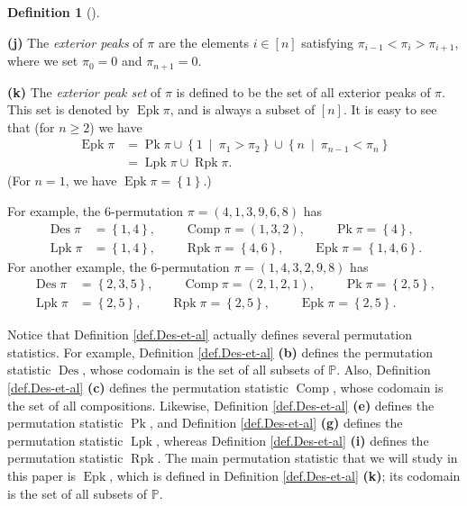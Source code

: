 \documentclass[numbers=enddot,12pt,final,onecolumn,notitlepage]{scrartcl}%
\theoremstyle{definition}
\newtheorem{defi}[theo]{Definition}
\newenvironment{definition}[1][]
{\begin{defi}[#1]\begin{leftbar}}
{\end{leftbar}\end{defi}}
\begin{document}
\begin{definition}
\textbf{(j)} The \textit{exterior peaks} of $\pi$ are the elements
$i\in\left[  n\right]  $ satisfying $\pi_{i-1}<\pi_{i}>\pi_{i+1}$, where we
set $\pi_{0}=0$ and $\pi_{n+1}=0$.

\textbf{(k)} The \textit{exterior peak set} of $\pi$ is defined to be the set
of all exterior peaks of $\pi$. This set is denoted by $\operatorname*{Epk}%
\pi$, and is always a subset of $\left[  n\right]  $. It is easy to see that
(for $n\geq2$) we have%
\begin{align*}
\operatorname*{Epk}\pi &  =\operatorname*{Pk}\pi\cup\left\{  1\ \mid\ \pi
_{1}>\pi_{2}\right\}  \cup\left\{  n\ \mid\ \pi_{n-1}<\pi_{n}\right\} \\
&  =\operatorname*{Lpk}\pi\cup\operatorname*{Rpk}\pi.
\end{align*}
(For $n=1$, we have $\operatorname*{Epk}\pi=\left\{  1\right\}  $.)
\end{definition}

For example, the $6$-permutation $\pi=\left(  4,1,3,9,6,8\right)  $ has%
\begin{align*}
\operatorname*{Des}\pi &  =\left\{  1,4\right\}
,\ \ \ \ \ \ \ \ \ \ \operatorname*{Comp}\pi=\left(  1,3,2\right)
,\ \ \ \ \ \ \ \ \ \ \operatorname*{Pk}\pi=\left\{  4\right\}  ,\\
\operatorname*{Lpk}\pi &  =\left\{  1,4\right\}
,\ \ \ \ \ \ \ \ \ \ \operatorname*{Rpk}\pi=\left\{  4,6\right\}
,\ \ \ \ \ \ \ \ \ \ \operatorname*{Epk}\pi=\left\{  1,4,6\right\}  .
\end{align*}
For another example, the $6$-permutation $\pi=\left(  1,4,3,2,9,8\right)  $
has%
\begin{align*}
\operatorname*{Des}\pi &  =\left\{  2,3,5\right\}
,\ \ \ \ \ \ \ \ \ \ \operatorname*{Comp}\pi=\left(  2,1,2,1\right)
,\ \ \ \ \ \ \ \ \ \ \operatorname*{Pk}\pi=\left\{  2,5\right\}  ,\\
\operatorname*{Lpk}\pi &  =\left\{  2,5\right\}
,\ \ \ \ \ \ \ \ \ \ \operatorname*{Rpk}\pi=\left\{  2,5\right\}
,\ \ \ \ \ \ \ \ \ \ \operatorname*{Epk}\pi=\left\{  2,5\right\}  .
\end{align*}


Notice that Definition \ref{def.Des-et-al} actually defines several
permutation statistics. For example, Definition \ref{def.Des-et-al}
\textbf{(b)} defines the permutation statistic $\operatorname*{Des}$, whose
codomain is the set of all subsets of $\mathbb{P}$. Also, Definition
\ref{def.Des-et-al} \textbf{(c)} defines the permutation statistic
$\operatorname*{Comp}$, whose codomain is the set of all compositions.
Likewise, Definition \ref{def.Des-et-al} \textbf{(e)} defines the permutation
statistic $\operatorname*{Pk}$, and Definition \ref{def.Des-et-al}
\textbf{(g)} defines the permutation statistic $\operatorname*{Lpk}$, whereas
Definition \ref{def.Des-et-al} \textbf{(i)} defines the permutation statistic
$\operatorname*{Rpk}$. The main permutation statistic that we will study in
this paper is $\operatorname*{Epk}$, which is defined in Definition
\ref{def.Des-et-al} \textbf{(k)}; its codomain is the set of all subsets of
$\mathbb{P}$.
\end{document}
